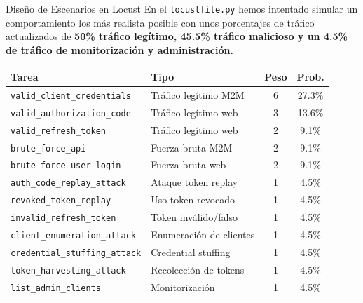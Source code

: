 \documentclass[10pt, aspectratio=169]{beamer}
\begin{document}
	\begin{frame}{Diseño de Escenarios en Locust}
	En el \texttt{locustfile.py} hemos intentado simular un comportamiento los más realista posible con unos porcentajes de tráfico actualizados de \textbf{50\% tráfico legítimo, 45.5\% tráfico malicioso y un 4.5\% de tráfico de monitorización y administración.}
	
	\vspace{0.2cm}
	
	\begin{table}[H]
		\centering
		\footnotesize %
		\begin{tabular}{llcc}
			\toprule
			\textbf{Tarea} & \textbf{Tipo} & \textbf{Peso} & \textbf{Prob.} \\
			\midrule
			\texttt{valid\_client\_credentials}     & Tráfico legítimo M2M      & 6 & 27.3\% \\
			\texttt{valid\_authorization\_code}     & Tráfico legítimo web      & 3 & 13.6\% \\
			\texttt{valid\_refresh\_token}          & Tráfico legítimo web      & 2 & 9.1\% \\
			\texttt{brute\_force\_api}              & Fuerza bruta M2M          & 2 & 9.1\% \\
			\texttt{brute\_force\_user\_login}      & Fuerza bruta web          & 2 & 9.1\% \\
			\texttt{auth\_code\_replay\_attack}     & Ataque token replay       & 1 & 4.5\% \\
			\texttt{revoked\_token\_replay}         & Uso token revocado        & 1 & 4.5\% \\
			\texttt{invalid\_refresh\_token}        & Token inválido/falso      & 1 & 4.5\% \\
			\texttt{client\_enumeration\_attack}    & Enumeración de clientes   & 1 & 4.5\% \\
			\texttt{credential\_stuffing\_attack}   & Credential stuffing       & 1 & 4.5\% \\
			\texttt{token\_harvesting\_attack}      & Recolección de tokens     & 1 & 4.5\% \\
			\texttt{list\_admin\_clients}           & Monitorización            & 1 & 4.5\% \\
			\bottomrule
		\end{tabular}
	\end{table}
	
	\end{frame}
	
\end{document}
